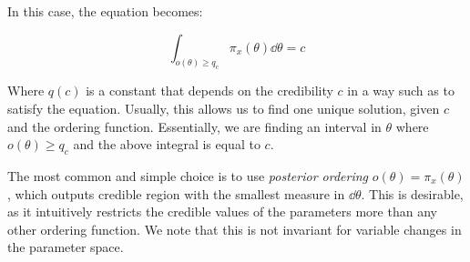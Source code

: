 In this case, the equation becomes:
	
	\[
	\int_{o(\theta)\geq q_c} \pi_x(\theta)\dd \theta = c
	\]

Where $q(c)$ is a constant that depends on the credibility $c$ in a way such as to satisfy the equation. Usually, this allows us to find one unique solution, given $c$ and the ordering function. Essentially, we are finding an interval in $\theta$ where $o(\theta)\geq q_c$ and the above integral is equal to $c$.

The most common and simple choice is to use \emph{posterior ordering} $o(\theta) =\pi_x(\theta)$, which outputs credible region with the smallest measure in $\dd\theta$. This is desirable, as it intuitively restricts the credible values of the parameters more than any other ordering function. We note that this is not invariant for variable changes in the parameter space. 


